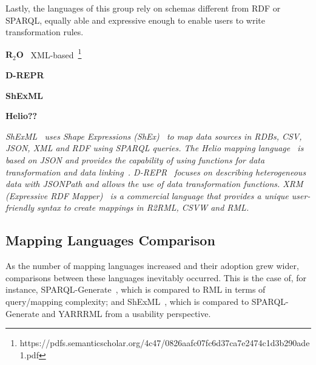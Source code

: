 Lastly, the languages of this group rely on schemas different from RDF or SPARQL, equally able and expressive enough to enable users to write transformation rules. 


\noindent\textbf{R$_2$O}~\parencite{barrasa2004r2o} XML-based~\footnote{https://pdfs.semanticscholar.org/4c47/0826aafc07fc6d37ca7e2474c1d3b290ade1.pdf}

\noindent\textbf{D-REPR}~\parencite{Vu2019d-repr}

\noindent\textbf{ShExML}~\parencite{Garcia-Gonzalez2020shexml,garcia2021shexml-challenges}

\noindent\textbf{Helio??}~\parencite{cimmino2022helio}

\textit{ShExML~\parencite{Garcia-Gonzalez2020shexml,garcia2021shexml-challenges} uses Shape Expressions (ShEx)~\parencite{prud2014shex} to map data sources in RDBs, CSV, JSON, XML and RDF using SPARQL queries. The Helio mapping language~\parencite{cimmino2022helio} is based on JSON and provides the capability of using functions for data transformation and data linking~\parencite{cimmino2018hybrid}. D-REPR~\parencite{Vu2019d-repr} focuses on describing heterogeneous data with JSONPath and allows the use of data transformation functions. XRM (Expressive RDF Mapper)~\parencite{xrm} is a commercial language that provides a unique user-friendly syntax to create mappings in R2RML, CSVW and RML.}










\subsection{Mapping Languages Comparison}
\label{sec:chp2_language-comparison}

As the number of mapping languages increased and their adoption grew wider, comparisons between these languages inevitably occurred. This is the case of, for instance, SPARQL-Generate~\parencite{Lefrancois2017sparqlgenerate}, which is compared to RML in terms of query/mapping complexity; and ShExML~\parencite{Garcia-Gonzalez2020shexml}, which is compared to SPARQL-Generate and YARRRML from a usability perspective.

